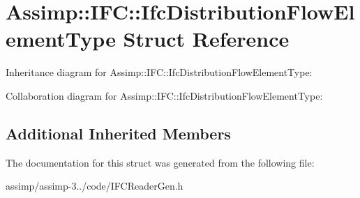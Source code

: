 \hypertarget{struct_assimp_1_1_i_f_c_1_1_ifc_distribution_flow_element_type}{\section{Assimp\+:\+:I\+F\+C\+:\+:Ifc\+Distribution\+Flow\+Element\+Type Struct Reference}
\label{struct_assimp_1_1_i_f_c_1_1_ifc_distribution_flow_element_type}
}


Inheritance diagram for Assimp\+:\+:I\+F\+C\+:\+:Ifc\+Distribution\+Flow\+Element\+Type\+:


Collaboration diagram for Assimp\+:\+:I\+F\+C\+:\+:Ifc\+Distribution\+Flow\+Element\+Type\+:
\subsection*{Additional Inherited Members}


The documentation for this struct was generated from the following file\+:\begin{DoxyCompactItemize}
\item 
assimp/assimp-\/3../code/I\+F\+C\+Reader\+Gen.\+h\end{DoxyCompactItemize}
